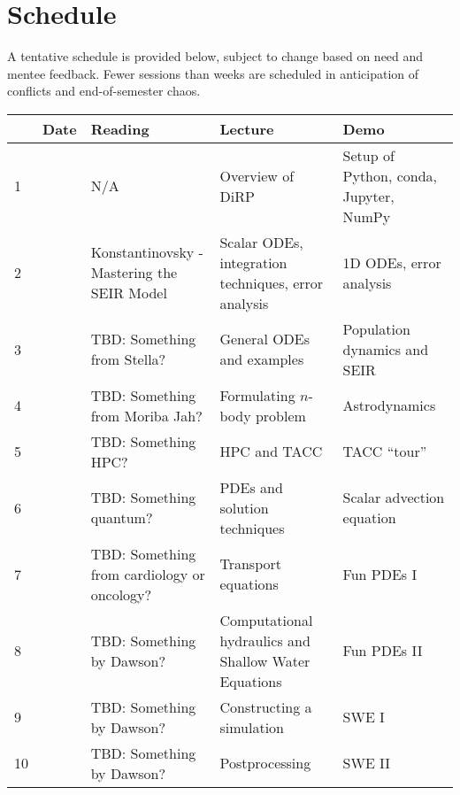 \documentclass{article}
\begin{document}
	\section*{Schedule}
	A tentative schedule is provided below, subject to change based on need and mentee feedback. Fewer sessions than weeks are scheduled in anticipation of conflicts and end-of-semester chaos.
	
	\begin{tabular}{l|lp{4cm}p{4cm}p{4cm}}
		& Date & Reading & Lecture & Demo \\
		\hline
		1 &  & N/A & Overview of DiRP & Setup of Python, conda, Jupyter, NumPy \\
		\hline
		2 &  & Konstantinovsky - Mastering the SEIR Model & Scalar ODEs, integration techniques, error analysis & 1D ODEs, error analysis \\
		\hline
		3 &  & TBD: Something from Stella? & General ODEs and examples & Population dynamics and SEIR \\
		\hline
		4 &  & TBD: Something from Moriba Jah? & Formulating $n$-body problem & Astrodynamics \\
		\hline
		5 &  & TBD: Something HPC? & HPC and TACC & TACC ``tour'' \\
		\hline
		6 &  & TBD: Something quantum? & PDEs and solution techniques & Scalar advection equation \\
		\hline
		7 &  & TBD: Something from cardiology or oncology? & Transport equations & Fun PDEs I \\
		\hline
		8 &  & TBD: Something by Dawson? & Computational hydraulics and Shallow Water Equations & Fun PDEs II \\
		\hline
		9 &  & TBD: Something by Dawson? & Constructing a simulation & SWE I \\
		\hline
		10 &  & TBD: Something by Dawson? & Postprocessing & SWE II \\
	\end{tabular}
\end{document}
